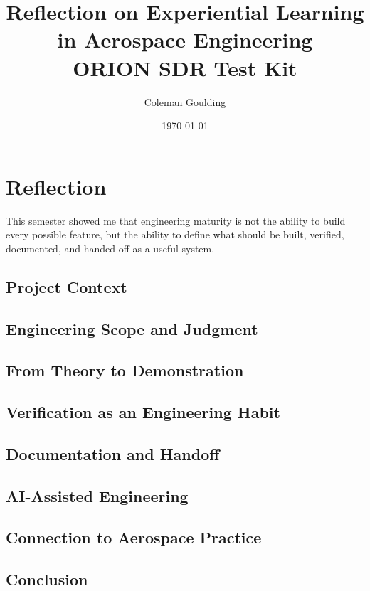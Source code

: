 \documentclass[11pt]{article}
\title{Reflection on Experiential Learning in Aerospace Engineering\\ORION SDR Test Kit}
\author{Coleman Goulding}
\date{\today}
\begin{document}
\maketitle

\section*{Reflection}

This semester showed me that engineering maturity is not the ability to build every possible feature, but the ability to define what should be built, verified, documented, and handed off as a useful system.

\subsection*{Project Context}

\subsection*{Engineering Scope and Judgment}

\subsection*{From Theory to Demonstration}

\subsection*{Verification as an Engineering Habit}

\subsection*{Documentation and Handoff}

\subsection*{AI-Assisted Engineering}

\subsection*{Connection to Aerospace Practice}

\subsection*{Conclusion}
\end{document}
